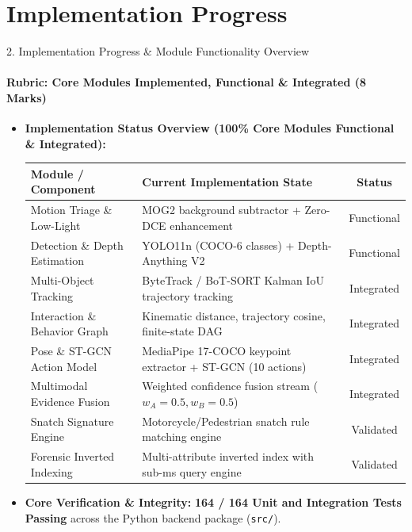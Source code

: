 \documentclass[aspectratio=169, 11pt]{beamer}
\begin{document}
\section{Implementation Progress}

\begin{frame}{2. Implementation Progress \& Module Functionality Overview}
    \framesubtitle{Rubric: Core Modules Implemented, Functional \& Integrated (8 Marks)}
    \begin{itemize}
        \item \textbf{Implementation Status Overview (100\% Core Modules Functional \& Integrated):}
        \begin{table}
            \centering
            \scriptsize
            \renewcommand{\arraystretch}{1.05}
            \begin{tabular}{p{4.0cm} p{7.0cm} c}
                \toprule
                \textbf{Module / Component} & \textbf{Current Implementation State} & \textbf{Status} \\
                \midrule
                Motion Triage \& Low-Light & MOG2 background subtractor + Zero-DCE enhancement & Functional \\
                Detection \& Depth Estimation & YOLO11n (COCO-6 classes) + Depth-Anything V2 & Functional \\
                Multi-Object Tracking & ByteTrack / BoT-SORT Kalman IoU trajectory tracking & Integrated \\
                Interaction \& Behavior Graph & Kinematic distance, trajectory cosine, finite-state DAG & Integrated \\
                Pose \& ST-GCN Action Model & MediaPipe 17-COCO keypoint extractor + ST-GCN (10 actions) & Integrated \\
                Multimodal Evidence Fusion & Weighted confidence fusion stream ($w_A=0.5, w_B=0.5$) & Integrated \\
                Snatch Signature Engine & Motorcycle/Pedestrian snatch rule matching engine & Validated \\
                Forensic Inverted Indexing & Multi-attribute inverted index with sub-ms query engine & Validated \\
                \bottomrule
            \end{tabular}
        \end{table}
        \item \textbf{Core Verification \& Integrity:} \textbf{164 / 164 Unit and Integration Tests Passing} across the Python backend package (\texttt{src/}).
    \end{itemize}
\end{frame}
\end{document}
